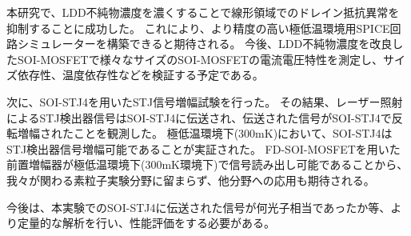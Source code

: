 	本研究で、LDD不純物濃度を濃くすることで線形領域でのドレイン抵抗異常を抑制することに成功した。
	これにより、より精度の高い極低温環境用SPICE回路シミュレーターを構築できると期待される。
	今後、LDD不純物濃度を改良したSOI-MOSFETで様々なサイズのSOI-MOSFETの電流電圧特性を測定し、サイズ依存性、温度依存性などを検証する予定である。
	
	次に、SOI-STJ4を用いたSTJ信号増幅試験を行った。
	その結果、レーザー照射によるSTJ検出器信号はSOI-STJ4に伝送され、伝送された信号がSOI-STJ4で反転増幅されたことを観測した。
	極低温環境下(300mK)において、SOI-STJ4はSTJ検出器信号増幅可能であることが実証された。
	FD-SOI-MOSFETを用いた前置増幅器が極低温環境下(300mK環境下)で信号読み出し可能であることから、我々が関わる素粒子実験分野に留まらず、他分野への応用も期待される。
	
	今後は、本実験でのSOI-STJ4に伝送された信号が何光子相当であったか等、より定量的な解析を行い、性能評価をする必要がある。
	